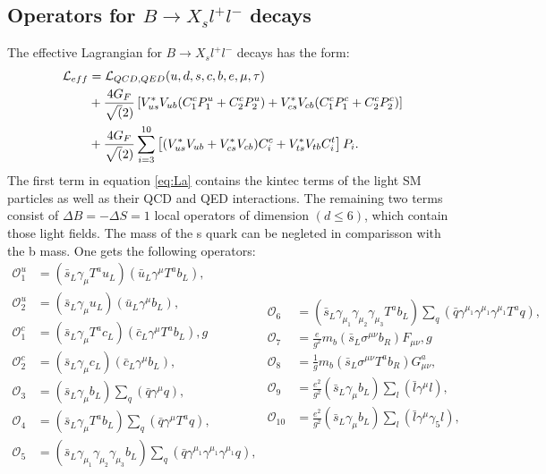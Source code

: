\documentclass[english]{uzhpub}
\begin{document}
\subsection{Operators for $B \rightarrow X_s l^+l^-$ decays}
The effective Lagrangian for $B \rightarrow X_s l^+l^-$ decays has the form: \\
\begin{align}
  \mathcal{L}_{eff} &= \mathcal{L}_{QCD,QED}(u,d,s,c,b,e,\mu,\tau) \notag\\
                    &+ \frac{4G_F}{\sqrt(2)} \left[ V_{us}^* V_{ub} (C_1^c P_1^u + C_2^c P_2^u) + V_{cs}^* V_{cb} (C_1^c P_1^c + C_2^c P_2^c) \right] \label{eq:La} \\
                    &+ \frac{4G_F}{\sqrt(2)} \sum_{i=3}^{10} \left[ (V_{us}^* V_{ub} + V_{cs}^* V_{cb})C_i^c + V_{ts}^* V_{tb} C_i^t  \right]P_i . \notag
\end{align}
The first term in equation \ref{eq:La} contains the kintec terms of the light SM particles as well as their QCD and QED interactions. The remaining two terms consist of $\Delta B = - \Delta S =1$ local operators of dimension $(d \leq 6)$, which contain those light fields. The mass of the s quark can be negleted in comparisson with the b mass. One gets the following operators:
\begin{equation}
  \begin{split}
  \mathcal{O}_1^u &= (\bar{s}_L \gamma_\mu T^a u_L)(\bar{u}_L \gamma^\mu T^a b_L),  \\
  \mathcal{O}_2^u &= (\bar{s}_L \gamma_\mu u_L) (\bar{u}_L \gamma^\mu b_L),  \\
  \mathcal{O}_1^c &= (\bar{s}_L \gamma_\mu T^a c_L) (\bar{c}_L \gamma^\mu T^a b_L), g \\
  \mathcal{O}_2^c &= (\bar{s}_L \gamma_\mu c_L) (\bar{c}_L \gamma^\mu b_L),  \\
  \mathcal{O}_3 &= (\bar{s}_L \gamma_\mu b_L) \sum_q (\bar{q} \gamma^\mu q),  \\
  \mathcal{O}_4 &= (\bar{s}_L \gamma_\mu T^a b_L) \sum_q (\bar{q} \gamma^\mu T^a q),  \\
  \mathcal{O}_5 &= (\bar{s}_L \gamma_{\mu_1} \gamma_{\mu_2} \gamma_{\mu_3} b_L ) \sum_q (\bar{q} \gamma^{\mu_1} \gamma^{\mu_1} \gamma^{\mu_1} q),
\end{split}
\begin{split}
  \mathcal{O}_6 &= (\bar{s}_L \gamma_{\mu_1} \gamma_{\mu_2} \gamma_{\mu_3} T^a b_L) \sum_q (\bar{q} \gamma^{\mu_1} \gamma^{\mu_1} \gamma^{\mu_1} T^a q), \\
  \mathcal{O}_7 &= \frac{e}{g^2} m_b (\bar{s}_L \sigma^{\mu \nu} b_R) F_{\mu \nu},g \\
  \mathcal{O}_8 &= \frac{1}{g} m_b (\bar{s}_L \sigma^{\mu \nu} T^a b_R) G_{\mu \nu}^a,  \\
  \mathcal{O}_9 &= \frac{e^2}{g^2} (\bar{s}_L \gamma_\mu b_L) \sum_l (\bar{l} \gamma^\mu l),  \\
  \mathcal{O}_{10} &= \frac{e^2}{g^2} (\bar{s}_L \gamma_\mu b_L) \sum_l (\bar{l} \gamma^\mu \gamma_5 l),
\end{split}
\label{eq:P}
\end{equation}
\end{document}
